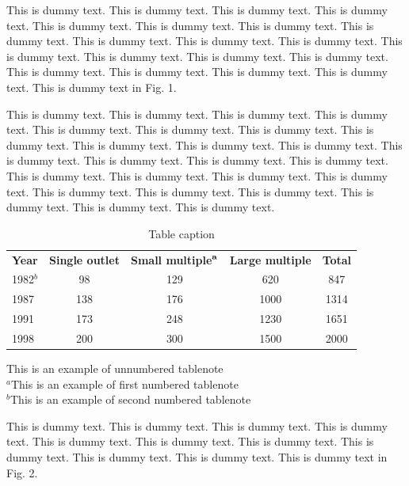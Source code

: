 \documentclass{jpp}
\begin{document}
This is dummy text. This is dummy text. This is dummy text. This is dummy text. This is
dummy text. This is dummy text. This is dummy text. This is dummy text. This is dummy
text. This is dummy text. This is dummy text. This is dummy text. This is dummy text. This
is dummy text. This is dummy text. This is dummy text. This is dummy text. This is dummy
text. This is dummy text. This is dummy text in Fig. 1.


This is dummy text. This is dummy text. This is dummy text. This is dummy text. This is
dummy text. This is dummy text. This is dummy text. This is dummy text. This is dummy
text. This is dummy text. This is dummy text. This is dummy text. This is dummy text. This
is dummy text. This is dummy text. This is dummy text. This is dummy text. This is dummy
text. This is dummy text. This is dummy text. This is dummy text. This is dummy text. This
is dummy text. This is dummy text. This is dummy text.


\begin{table}
\begin{center}
\caption{Table caption}
{\begin{tabular}{lcccc}
\textbf{Year} & \textbf{Single outlet} &  \textbf{Small multiple}$^{\bf a}$ & \textbf{Large multiple} & \textbf{Total}\\[6pt]
1982$^{b}$ & 98 & 129 & 620 & 847\\
1987 & 138 & 176 & 1000 & 1314\\
1991 & 173 & 248 & 1230 & 1651\\
1998 & 200 & 300 & 1500 & 2000\\[6pt]
\end{tabular}}{\par This is an example of unnumbered tablenote\\
$^{a}$This is an example of first numbered tablenote\\
$^{b}$This is an example of second numbered tablenote\\}
\end{center}
\end{table}

This is dummy text. This is dummy text. This is dummy text. This is dummy text. This is
dummy text. This is dummy text. This is dummy text. This is dummy text. This is dummy
text. This is dummy text. This is dummy text in Fig. 2.
\end{document}
